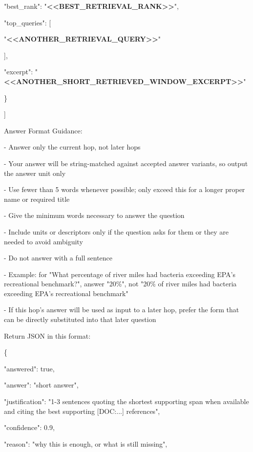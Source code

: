 \begin{tcolorbox}[colback=white, colframe=my-green, coltitle=black, parskip=5mm, title=\textbf{Hop Resolve}, halign=flush left, enhanced, breakable, skin first=enhanced, skin middle=enhanced, skin last=enhanced]
\begin{scriptsize}
    "best\_rank": "\textcolor{my-green}{\textbf{\textless{}\textless{}BEST\_RETRIEVAL\_RANK\textgreater{}\textgreater{}}}",\par
    "top\_queries": [\par
      "\textcolor{my-green}{\textbf{\textless{}\textless{}ANOTHER\_RETRIEVAL\_QUERY\textgreater{}\textgreater{}}}"\par
    ],\par
    "excerpt": "\textcolor{my-green}{\textbf{\textless{}\textless{}ANOTHER\_SHORT\_RETRIEVED\_WINDOW\_EXCERPT\textgreater{}\textgreater{}}}"\par
  \}\par
]\par
\mbox{}\par
Answer Format Guidance:\par
- Answer only the current hop, not later hops\par
- Your answer will be string-matched against accepted answer variants, so output the answer unit only\par
- Use fewer than 5 words whenever possible; only exceed this for a longer proper name or required title\par
- Give the minimum words necessary to answer the question\par
- Include units or descriptors only if the question asks for them or they are needed to avoid ambiguity\par
- Do not answer with a full sentence\par
- Example: for "What percentage of river miles had bacteria exceeding EPA's recreational benchmark?", answer "20\%", not "20\% of river miles had bacteria exceeding EPA's recreational benchmark"\par
- If this hop's answer will be used as input to a later hop, prefer the form that can be directly substituted into that later question\par
\mbox{}\par
Return JSON in this format:\par
\{\par
  "answered": true,\par
  "answer": "short answer",\par
  "justification": "1-3 sentences quoting the shortest supporting span when available and citing the best supporting [DOC:...] references",\par
  "confidence": 0.9,\par
  "reason": "why this is enough, or what is still missing",\par

\end{scriptsize}
\end{tcolorbox}
